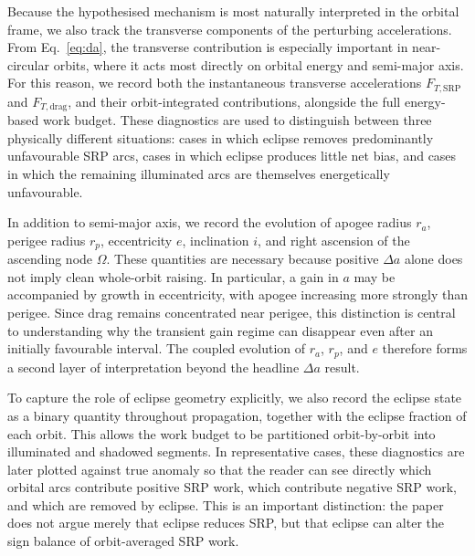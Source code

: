 \vspace{5pt}
\par\noindent Because the hypothesised mechanism is most naturally interpreted in the orbital frame, we also track the transverse components of the perturbing accelerations. From Eq.~\eqref{eq:da}, the transverse contribution is especially important in near-circular orbits, where it acts most directly on orbital energy and semi-major axis. For this reason, we record both the instantaneous transverse accelerations \(F_{T,\mathrm{SRP}}\) and \(F_{T,\mathrm{drag}}\), and their orbit-integrated contributions, alongside the full energy-based work budget. These diagnostics are used to distinguish between three physically different situations: cases in which eclipse removes predominantly unfavourable SRP arcs, cases in which eclipse produces little net bias, and cases in which the remaining illuminated arcs are themselves energetically unfavourable.

\vspace{5pt}
\par\noindent In addition to semi-major axis, we record the evolution of apogee radius \(r_a\), perigee radius \(r_p\), eccentricity \(e\), inclination \(i\), and right ascension of the ascending node \(\Omega\). These quantities are necessary because positive \(\Delta a\) alone does not imply clean whole-orbit raising. In particular, a gain in \(a\) may be accompanied by growth in eccentricity, with apogee increasing more strongly than perigee. Since drag remains concentrated near perigee, this distinction is central to understanding why the transient gain regime can disappear even after an initially favourable interval. The coupled evolution of \(r_a\), \(r_p\), and \(e\) therefore forms a second layer of interpretation beyond the headline \(\Delta a\) result.

\vspace{5pt}
\par\noindent To capture the role of eclipse geometry explicitly, we also record the eclipse state as a binary quantity throughout propagation, together with the eclipse fraction of each orbit. This allows the work budget to be partitioned orbit-by-orbit into illuminated and shadowed segments. In representative cases, these diagnostics are later plotted against true anomaly so that the reader can see directly which orbital arcs contribute positive SRP work, which contribute negative SRP work, and which are removed by eclipse. This is an important distinction: the paper does not argue merely that eclipse reduces SRP, but that eclipse can alter the sign balance of orbit-averaged SRP work.

